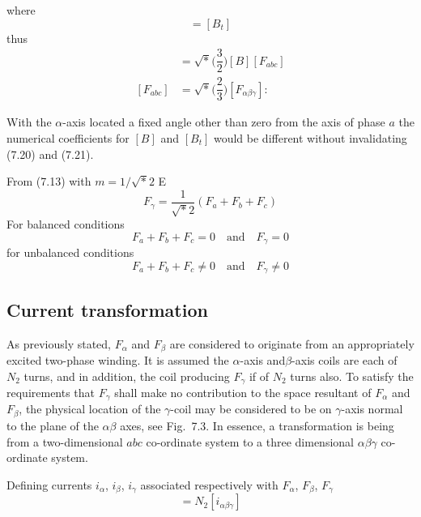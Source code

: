 \documentclass[a4paper,numbers=noenddot,12pt]{scrbook}
\begin{document}
    where
    \begin{equation}
        [B^{-1}] = [B_t]
        \label{eq:Eq7.19}
    \end{equation}
    thus
    \begin{align}
        [F_{\alpha \beta \gamma}]  & = \sqrt*{\Big(\dfrac{3}{2}\Big)}  [B] [F_{abc}] \\
        [F_{abc}]  & =  \sqrt*{\Big(\dfrac{2}{3}\Big)} [F_{\alpha \beta \gamma}]
        \label{eq:Eq7.21}:
    \end{align}

    With the $\alpha$-axis located a fixed angle other than zero from the axis of phase $a$ the numerical coefficients for $[B]$ and $[B_t]$ would be different without invalidating (7.20) and (7.21).

    From (7.13) with $m = 1 / \sqrt*{2}$
    E\begin{equation}
        F_{\gamma} = \dfrac{1}{\sqrt*{2}}(F_a + F_b + F_c)
        \label{eq:Eq7.22}
    \end{equation}
    For balanced conditions
    \begin{equation*}
        F_a + F_b + F_c = 0 \quad \text{and} \quad F_{\gamma} = 0
    \end{equation*}
    for unbalanced conditions
    \begin{equation*}
        F_a + F_b + F_c \neq 0 \quad \text{and} \quad F_{\gamma} \neq 0
    \end{equation*}

    \subsection{Current transformation}
    As previously stated, $F_{\alpha}$ and $F_{\beta}$ are considered to originate from an appropriately excited two-phase winding. It is assumed the $\alpha$-axis and$\beta$-axis coils are each of $N_2$ turns, and in addition, the coil producing $F_{\gamma}$ if of $N_2$ turns also. To satisfy the requirements that $F_{\gamma}$ shall make no contribution to the space resultant of $F_{\alpha}$ and $F_{\beta}$, the physical location of the
    $\gamma$-coil may be considered to be on $\gamma$-axis normal to the plane of the $\alpha \beta$ axes, see Fig.\ 7.3. In essence, a transformation is being from a two-dimensional $abc$ co-ordinate system to a three dimensional $\alpha \beta \gamma$ co-ordinate system.

    Defining currents $i_{\alpha}$, $i_{\beta}$, $i_{\gamma}$ associated respectively with $F_{\alpha}$, $F_{\beta}$, $F_{\gamma}$
    \begin{equation}
        [F_{\alpha \beta \gamma}] = N_2 [i_{\alpha \beta \gamma}]
        \label{eq:Eq7.23}
    \end{equation}
\end{document}
